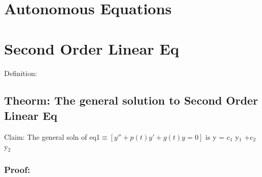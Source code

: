 \documentclass[11pt]{article}
\begin{document}
\section{Autonomous Equations}
\label{sec-8}

\section{Second Order Linear Eq}
\label{sec-9}

  Definition:

\subsection{Theorm: The general solution to Second Order Linear Eq}
\label{sec-9.1}

   Claim: The general soln of eq1$\equiv [y'' + p(t)y' + g(t)y = 0]$  is y = c$_1$
   y$_1$ +c$_2$ y$_2$\\

\subsubsection{Proof:}
\label{sec-9.1.1}
\end{document}
